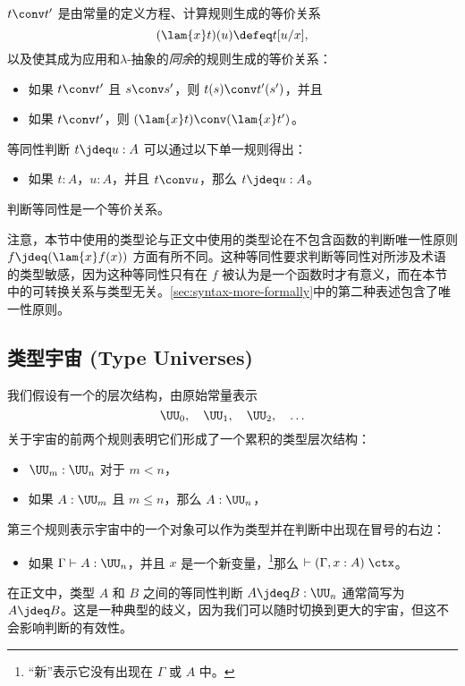%
%
$t \conv t'$ 是由常量的定义方程、计算规则生成的等价关系
%
\[
  (\lam{x} t)(u) \defeq t[u/x],
\]
%
以及使其成为应用和$\lambda$-抽象的\emph{同余}的规则生成的等价关系：
%
\begin{itemize}
  \item 如果 $t \conv t'$ 且 $s \conv s'$，则 $t(s) \conv t'(s')$，并且
  \item 如果 $t \conv t'$，则 $(\lam{x} t) \conv (\lam{x} t')$。
\end{itemize}
\noindent
等同性判断 $t \jdeq u : A$ 可以通过以下单一规则得出：
%
\begin{itemize}
  \item 如果 $t:A$，$u:A$，并且 $t \conv u$，那么 $t \jdeq u : A$。
\end{itemize}
%
判断等同性是一个等价关系。

注意，本节中使用的类型论与正文中使用的类型论在不包含函数的判断唯一性原则 $f \jdeq (\lam{x} f(x))$ 方面有所不同。这种等同性要求判断等同性对所涉及术语的类型敏感，因为这种等同性只有在 $f$ 被认为是一个函数时才有意义，而在本节中的可转换关系与类型无关。\cref{sec:syntax-more-formally}中的第二种表述包含了唯一性原则。


\subsection{类型宇宙 (Type Universes)}

我们假设有一个的层次结构，由原始常量表示
%
\begin{equation*}
  \UU_0, \quad \UU_1, \quad  \UU_2, \quad \ldots
\end{equation*}
%
关于宇宙的前两个规则表明它们形成了一个累积的类型层次结构：
%
\begin{itemize}
  \item $\UU_m : \UU_n$ 对于 $m < n$，
  \item 如果 $A:\UU_m$ 且 $m \le n$，那么 $A:\UU_n$，
\end{itemize}
%
第三个规则表示宇宙中的一个对象可以作为类型并在判断中出现在冒号的右边：
%
\begin{itemize}
  \item 如果 $\Gamma \vdash A : \UU_n$，并且 $x$ 是一个新变量，\footnote{“新”表示它没有出现在 $\Gamma$ 或 $A$ 中。}那么 $\vdash (\Gamma, x:A)\; \ctx$。
\end{itemize}
%
在正文中，类型 $A$ 和 $B$ 之间的等同性判断 $A \jdeq B : \UU_n$ 通常简写为 $A \jdeq B$。这是一种典型的歧义，因为我们可以随时切换到更大的宇宙，但这不会影响判断的有效性。

